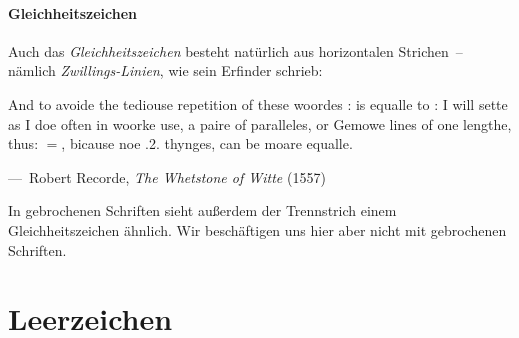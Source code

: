 \paragraph{Gleichheitszeichen}
Auch das \emph{Gleichheitszeichen} \Char{$=$} besteht natürlich aus
horizontalen Strichen~-- nämlich \emph{Zwillings-Linien}, wie sein
Erfinder 
schrieb:
\begin{displayquote}
  \foreignlanguage{british}{And to avoide the tediouse repetition of
    these woordes : is equalle to : I will sette as I doe often in
    woorke use, a paire of paralleles, or Gemowe lines of one lengthe,
    thus: $=$, bicause noe .2. thynges, can be moare equalle.}

  \quad---~Robert Recorde, \emph{The Whetstone of Witte} (1557)
\end{displayquote}

In gebrochenen Schriften sieht außerdem der Trennstrich einem
Gleichheitszeichen ähnlich.  Wir beschäftigen uns hier aber nicht mit
gebrochenen Schriften.

\section{Leerzeichen}

